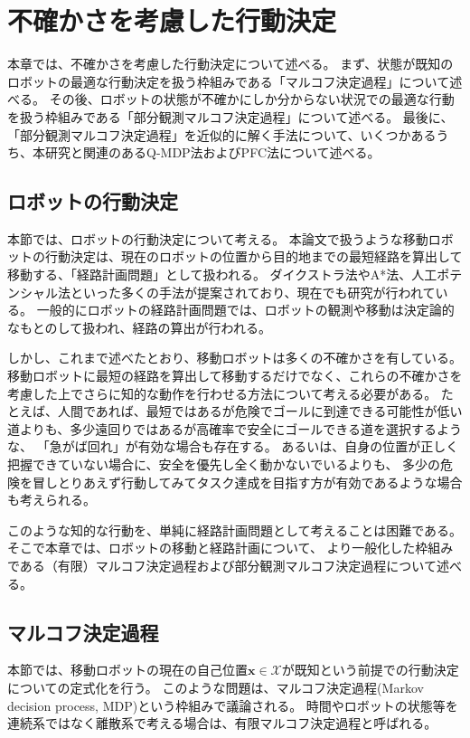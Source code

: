 \chapter{不確かさを考慮した行動決定}

本章では、不確かさを考慮した行動決定について述べる。
まず、状態が既知のロボットの最適な行動決定を扱う枠組みである「マルコフ決定過程」について述べる。
その後、ロボットの状態が不確かにしか分からない状況での最適な行動を扱う枠組みである「部分観測マルコフ決定過程」について述べる。
最後に、「部分観測マルコフ決定過程」を近似的に解く手法について、いくつかあるうち、本研究と関連のあるQ-MDP法およびPFC法について述べる。


\section{ロボットの行動決定}
本節では、ロボットの行動決定について考える。
本論文で扱うような移動ロボットの行動決定は、現在のロボットの位置から目的地までの最短経路を算出して移動する、「経路計画問題」として扱われる。
ダイクストラ法やA*法、人工ポテンシャル法といった多くの手法が提案されており、現在でも研究が行われている。
一般的にロボットの経路計画問題では、ロボットの観測や移動は決定論的なもとのして扱われ、経路の算出が行われる。

しかし、これまで述べたとおり、移動ロボットは多くの不確かさを有している。
移動ロボットに最短の経路を算出して移動するだけでなく、これらの不確かさを考慮した上でさらに知的な動作を行わせる方法について考える必要がある。
たとえば、人間であれば、最短ではあるが危険でゴールに到達できる可能性が低い道よりも、多少遠回りではあるが高確率で安全にゴールできる道を選択するような、
「急がば回れ」が有効な場合も存在する。
あるいは、自身の位置が正しく把握できていない場合に、安全を優先し全く動かないでいるよりも、
多少の危険を冒しとりあえず行動してみてタスク達成を目指す方が有効であるような場合も考えられる。

このような知的な行動を、単純に経路計画問題として考えることは困難である。
そこで本章では、ロボットの移動と経路計画について、
より一般化した枠組みである（有限）マルコフ決定過程および部分観測マルコフ決定過程について述べる。



\section{マルコフ決定過程} \label{section:mdp}
本節では、移動ロボットの現在の自己位置$\bm{x} \in \mathcal{X}$が既知という前提での行動決定についての定式化を行う。
このような問題は、マルコフ決定過程(Markov decision process, MDP)という枠組みで議論される。
時間やロボットの状態等を連続系ではなく離散系で考える場合は、有限マルコフ決定過程と呼ばれる。

